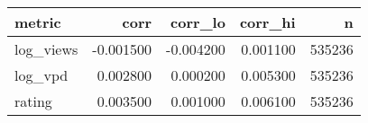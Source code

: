 \begin{tabular}{lrrrr}
\toprule
metric & corr & corr_lo & corr_hi & n \\
\midrule
log_views & -0.001500 & -0.004200 & 0.001100 & 535236 \\
log_vpd & 0.002800 & 0.000200 & 0.005300 & 535236 \\
rating & 0.003500 & 0.001000 & 0.006100 & 535236 \\
\bottomrule
\end{tabular}
